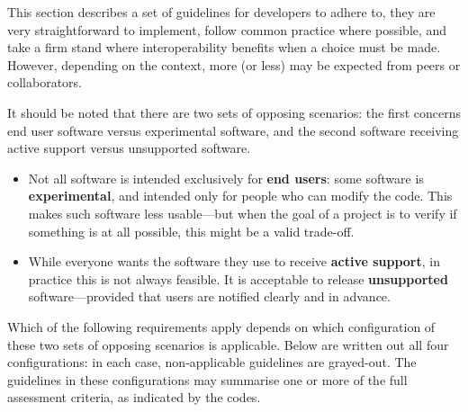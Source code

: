 \documentclass[a4paper,11pt]{article}
\begin{document}
This section describes a set of guidelines for developers to adhere to, they
are very straightforward to implement, follow common practice where possible,
and take a firm stand where interoperability benefits when a choice must be
made. However, depending on the context, more (or less) may be expected from
peers or collaborators.

It should be noted that there are two sets of opposing scenarios: the first
concerns end user software versus experimental software, and the second
software receiving active support versus unsupported software.  

\begin{itemize}
	\item Not all software is intended exclusively for \textbf{end users}: some software is \textbf{experimental}, and intended only for people who can modify the code. This makes such software less usable---but when the goal of a project is to verify if something is at all possible, this might be a valid trade-off.
	\item While everyone wants the software they use to receive \textbf{active support}, in practice this is not always feasible. It is acceptable to release \textbf{unsupported} software---provided that users are notified clearly and in advance.
\end{itemize} 

Which of the following requirements apply depends on which configuration of
these two sets of opposing scenarios is applicable.  Below are written out all four configurations: in each case, non-applicable guidelines are grayed-out. 
The guidelines in these configurations may summarise one or more of the full assessment criteria, as indicated by the codes.
\end{document}
